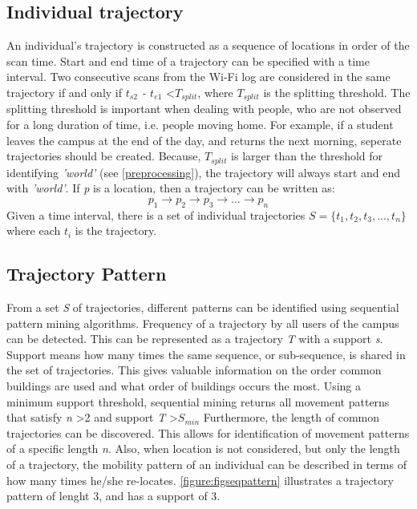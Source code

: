 \subsection{Individual trajectory}
An individual’s trajectory is constructed as a sequence of locations in order of the scan time. Start and end time of a trajectory can be specified with a time interval. Two consecutive scans from the Wi-Fi log are considered in the same trajectory if and only if \textit{$t_{s2}$ - $t_{e1}$} \textless \textit{$T_{split}$}, where \textit{$T_{split}$} is the splitting threshold. The splitting threshold is important when dealing with people, who are not observed for a long duration of time, i.e. people moving home. For example, if a student leaves the campus at the end of the day, and returns the next morning, seperate trajectories should be created. Because, \textit{$T_{split}$} is larger than the threshold for identifying \textit{'world'} (see \autoref{preprocessing}), the trajectory will always start and end with \textit{'world'}. If \textit{p} is a location, then a trajectory can be written as:
$$p_{1} \rightarrow p_{2} \rightarrow p_{3} \rightarrow …\rightarrow p_{n}$$
Given a time interval, there is a set of individual trajectories $\textit{S} = \{t_{1}, t_{2}, t_{3},...,t_{n}\}$ where each $t_{i}$ is the trajectory. 

\subsection{Trajectory Pattern}
From a set \textit{S} of trajectories, different patterns can be identified using sequential pattern mining algorithms. Frequency of a trajectory by all users of the campus can be detected. This can be represented as a trajectory \textit{T} with a support \textit{s}. Support means how many times the same sequence, or sub-sequence, is shared in the set of trajectories. This gives valuable information on the order common buildings are used and what order of buildings occurs the most. Using a minimum support threshold, sequential mining returns all movement patterns that satisfy \textit{n} \textgreater 2 and support \textit{T} \textgreater \textit{$S_{min}$}   Furthermore, the length of common trajectories can be discovered. This allows for identification of movement patterns of a specific length \textit{n}. Also, when location is not considered, but only the length of a trajectory, the mobility pattern of an individual can be described in terms of how many times he/she re-locates. \autoref{figure:figseqpattern} illustrates a trajectory pattern of lenght 3, and has a support of 3.

